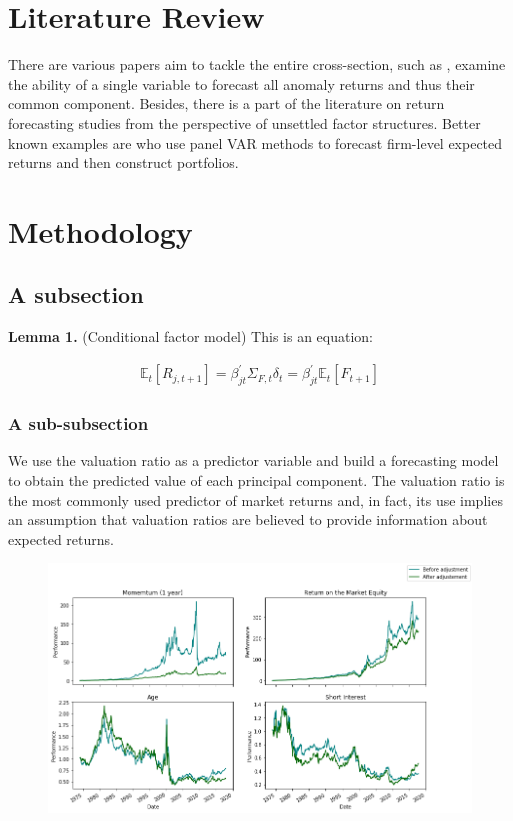 \documentclass{article}
\begin{document}
\section{Literature Review}
There are various papers aim to tackle the entire cross-section, such as \cite{akbas2015smart}, examine the ability of a single variable to forecast all
anomaly returns and thus their common component. Besides, there is a part of the literature on return forecasting studies from the perspective of unsettled factor structures. Better known examples are \cite{lochstoer2020drives} who use panel VAR methods to forecast firm-level expected returns and then construct portfolios. 

\section{Methodology}

\subsection{A subsection}

\textbf{Lemma 1.} (Conditional factor model) This is an equation:

\begin{equation}
\begin{aligned}
\mathbb{E}_{t}\left[R_{j, t+1}\right]=\beta_{j t}^{\prime} \Sigma_{F, t} \delta_{t}=\beta_{j t}^{\prime} \mathbb{E}_{t}\left[F_{t+1}\right] \label{1}
\end{aligned}
\end{equation}

\subsubsection{A sub-subsection}
We use the valuation ratio as a predictor variable and build a forecasting model to obtain the predicted value of each principal component. The valuation ratio is the most commonly used predictor of market returns and, in fact, its use implies an assumption that valuation ratios are believed to provide information about expected returns.

\begin{figure}[h]
\centering
\centering
\includegraphics[width=.8\linewidth]{Figure_1.png}
\label{Figure 1}
\end{figure}
\end{document}
